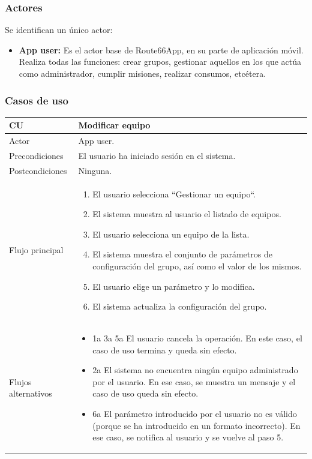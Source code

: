 \documentclass[twoside]{report}
\newcommand\addrow[2]{#1 &#2\\ }
\newcommand\addheading[2]{#1 &#2\\ \hline}
\newcommand\tabularhead{\begin{tabular}{lp{0.7\textwidth}}
\hline
}
\newenvironment{usecase}{\tabularhead}
{\hline\end{tabular}}
\begin{document}
\subsubsection{Actores}

Se identifican un único actor:

\begin{itemize}
\item \textbf{App user:} Es el actor base de Route66App, en su parte de aplicación móvil. Realiza todas las funciones: crear grupos, gestionar aquellos en los que actúa como administrador, cumplir misiones, realizar consumos, etcétera.
\end{itemize}

\subsubsection{Casos de uso}



\begin{usecase}
  \addheading{\textbf{CU\arabic{usecase}}}{Modificar equipo} 
  \addrow{Actor}{App user.}
  \addrow{Precondiciones}{El usuario ha iniciado sesión en el sistema.}
  \addrow{Postcondiciones}{Ninguna.}
  \addrow{Flujo principal}{
  		\begin{enumerate}
  		\item El usuario selecciona “Gestionar un equipo“. %
        \item El sistema muestra al usuario el listado de equipos. %
        \item El usuario selecciona un equipo de la lista. %
        \item El sistema muestra el conjunto de parámetros de configuración del grupo, así como el valor de los mismos. %
        \item El usuario elige un parámetro y lo modifica. %
        \item El sistema actualiza la configuración del grupo. %
  		\end{enumerate}
  }
  \addrow{Flujos alternativos}{
  		\begin{itemize}
  		\item 1a 3a 5a El usuario cancela la operación. En este caso, el caso de uso termina y queda sin efecto.
  		\item 2a El sistema no encuentra ningún equipo administrado por el usuario. En ese caso, se muestra un mensaje y el caso de uso queda sin efecto.
  		\item 6a El parámetro introducido por el usuario no es válido (porque se ha introducido en un formato incorrecto). En ese caso, se notifica al usuario y se vuelve al paso 5.
  		\end{itemize}
  }
\end{usecase}\\
\end{document}

